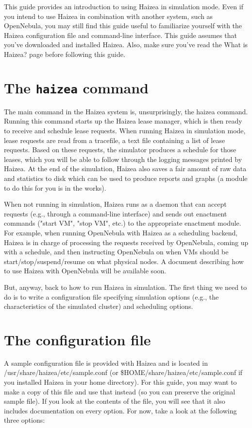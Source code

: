 This guide provides an introduction to using Haizea in simulation mode. Even if you intend to use Haizea in combination with another system, such as OpenNebula, you may still find this guide useful to familiarize yourself with the Haizea configuration file and command-line interface. This guide assumes that you've downloaded and installed Haizea. Also, make sure you've read the What is Haizea? page before following this guide.

\section{The \texttt{haizea} command}

The main command in the Haizea system is, unsurprisingly, the haizea command. Running this command starts up the Haizea lease manager, which is then ready to receive and schedule lease requests. When running Haizea in simulation mode, lease requests are read from a tracefile, a text file containing a list of lease requests. Based on these requests, the simulator produces a schedule for those leases, which you will be able to follow through the logging messages printed by Haizea. At the end of the simulation, Haizea also saves a fair amount of raw data and statistics to disk which can be used to produce reports and graphs (a module to do this for you is in the works).

When not running in simulation, Haizea runs as a daemon that can accept requests (e.g., through a command-line interface) and sends out enactment commands ("start VM", "stop VM", etc.) to the appropriate enactment module. For example, when running OpenNebula with Haizea as a scheduling backend, Haizea is in charge of processing the requests received by OpenNebula, coming up with a schedule, and then instructing OpenNebula on when VMs should be start/stop/suspend/resume on what physical nodes. A document describing how to use Haizea with OpenNebula will be available soon.

But, anyway, back to how to run Haizea in simulation. The first thing we need to do is to write a configuration file specifying simulation options (e.g., the characteristics of the simulated cluster) and scheduling options.

\section{The configuration file}

A sample configuration file is provided with Haizea and is located in /usr/share/haizea/etc/sample.conf (or \$HOME/share/haizea/etc/sample.conf if you installed Haizea in your home directory). For this guide, you may want to make a copy of this file and use that instead (so you can preserve the original sample file). If you look at the contents of the file, you will see that it also includes documentation on every option. For now, take a look at the following three options:

